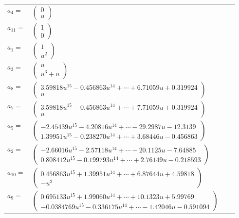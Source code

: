 \documentclass[1p]{elsarticle_modified}
\theoremstyle{definition}
\begin{document}
\begin{tabular}{m{7pt} m{180pt} m{7pt} m{180pt} }
\flushright $a_{4}=$&$\begin{pmatrix}0\\u\end{pmatrix}$ \\
\flushright $a_{11}=$&$\begin{pmatrix}1\\0\end{pmatrix}$ \\
\flushright $a_{1}=$&$\begin{pmatrix}1\\u^2\end{pmatrix}$ \\
\flushright $a_{3}=$&$\begin{pmatrix}u\\u^3+u\end{pmatrix}$ \\
\flushright $a_{8}=$&$\begin{pmatrix}3.59818 u^{15}-0.456863 u^{14}+\cdots+6.71059 u+0.319924\\u\end{pmatrix}$ \\
\flushright $a_{7}=$&$\begin{pmatrix}3.59818 u^{15}-0.456863 u^{14}+\cdots+7.71059 u+0.319924\\u\end{pmatrix}$ \\
\flushright $a_{5}=$&$\begin{pmatrix}-2.45439 u^{15}-4.20816 u^{14}+\cdots-29.2987 u-12.3139\\1.39951 u^{15}-0.238270 u^{14}+\cdots+3.68446 u-0.456863\end{pmatrix}$ \\
\flushright $a_{2}=$&$\begin{pmatrix}-2.66016 u^{15}-2.57118 u^{14}+\cdots-20.1125 u-7.64885\\0.808412 u^{15}-0.199793 u^{14}+\cdots+2.76149 u-0.218593\end{pmatrix}$ \\
\flushright $a_{10}=$&$\begin{pmatrix}0.456863 u^{15}+1.39951 u^{14}+\cdots+6.87644 u+4.59818\\- u^2\end{pmatrix}$ \\
\flushright $a_{9}=$&$\begin{pmatrix}0.695133 u^{15}+1.99060 u^{14}+\cdots+10.1323 u+5.99769\\-0.0384769 u^{15}-0.336175 u^{14}+\cdots-1.42046 u-0.591094\end{pmatrix}$ \\

\end{tabular}
\end{document}
